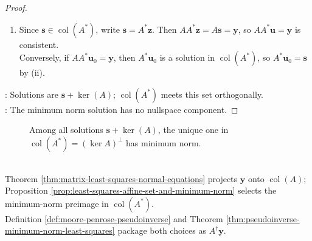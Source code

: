 \begin{theorem}
\begin{proof}
\begin{enumerate}[label=(\roman*)]
\item Since $\mathbf{s}\in\operatorname{col}(A^*)$, write $\mathbf{s}=A^*\mathbf{z}$. Then $AA^*\mathbf{z}=A\mathbf{s}=\mathbf{y}$, so $AA^*\mathbf{u}=\mathbf{y}$ is consistent.\\
Conversely, if $AA^*\mathbf{u}_0=\mathbf{y}$, then $A^*\mathbf{u}_0$ is a solution in $\operatorname{col}(A^*)$, so $A^*\mathbf{u}_0=\mathbf{s}$ by (ii).
\end{enumerate}
: Solutions are $\mathbf{s}+\ker(A)$; $\operatorname{col}(A^*)$ meets this set orthogonally.\\
: The minimum norm solution has no nullspace component.
\end{proof}
\end{theorem}

\begin{figure}[H]
  \centering
  
  \caption{Among all solutions $\mathbf{s}+\ker(A)$, the unique one in $\operatorname{col}(A^*)=(\ker A)^\perp$ has minimum norm.}
  \label{fig:minimum-norm-solution}
\end{figure}

\begin{perspective} \label{per:least-squares-pseudoinverse-roadmap} \\
Theorem \ref{thm:matrix-least-squares-normal-equations} projects $\mathbf{y}$ onto $\operatorname{col}(A)$; Proposition \ref{prop:least-squares-affine-set-and-minimum-norm} selects the minimum-norm preimage in $\operatorname{col}(A^*)$.\\
Definition \ref{def:moore-penrose-pseudoinverse} and Theorem \ref{thm:pseudoinverse-minimum-norm-least-squares} package both choices as $A^{\dagger}\mathbf{y}$.
\end{perspective}
